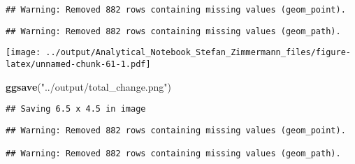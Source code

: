 \documentclass[]{article}
\newenvironment{Shaded}{\begin{snugshade}}{\end{snugshade}}
\newcommand{\KeywordTok}[1]{\textcolor[rgb]{0.13,0.29,0.53}{\textbf{#1}}}
\newcommand{\NormalTok}[1]{#1}
\newcommand{\StringTok}[1]{\textcolor[rgb]{0.31,0.60,0.02}{#1}}
\begin{document}
\begin{verbatim}
## Warning: Removed 882 rows containing missing values (geom_point).
\end{verbatim}

\begin{verbatim}
## Warning: Removed 882 rows containing missing values (geom_path).
\end{verbatim}

\texttt{[image: ../output/Analytical\_Notebook\_Stefan\_Zimmermann\_files/figure-latex/unnamed-chunk-61-1.pdf]}

\begin{Shaded}
\begin{Highlighting}[]
\KeywordTok{ggsave}\NormalTok{(}\StringTok{"../output/total_change.png"}\NormalTok{)}
\end{Highlighting}
\end{Shaded}

\begin{verbatim}
## Saving 6.5 x 4.5 in image
\end{verbatim}

\begin{verbatim}
## Warning: Removed 882 rows containing missing values (geom_point).

## Warning: Removed 882 rows containing missing values (geom_path).
\end{verbatim}
\end{document}
